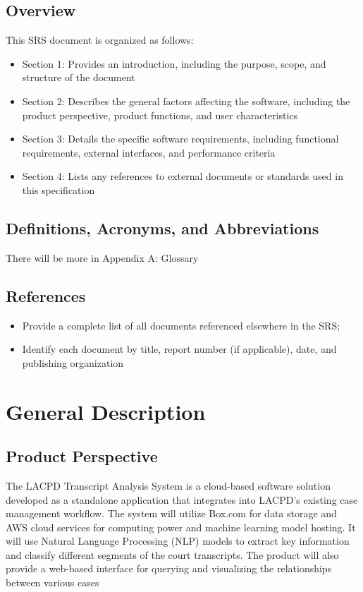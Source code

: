 \documentclass[12pt]{article}
\begin{document}
\subsection{Overview}
 This SRS document is organized as follows:
\begin{itemize}
  \item Section 1: Provides an introduction, including the purpose, scope, and structure of the
 document
  \item  Section 2: Describes the general factors affecting the software, including the product
 perspective, product functions, and user characteristics
  \item  Section 3: Details the specific software requirements, including functional requirements,
 external interfaces, and performance criteria
  \item Section 4: Lists any references to external documents or standards used in this specification
\end{itemize}

\subsection{Definitions, Acronyms, and Abbreviations}
 There will be more in Appendix A: Glossary

\subsection{References}
\begin{itemize}
  \item  Provide a complete list of all documents referenced elsewhere in the SRS;
  \item  Identify each document by title, report number (if applicable), date, and publishing
 organization
\end{itemize}

\section{General Description}
\subsection{Product Perspective}
 The LACPD Transcript Analysis System is a cloud-based software solution developed as a
 standalone application that integrates into LACPD’s existing case management workflow. The
 system will utilize Box.com for data storage and AWS cloud services for computing power and
 machine learning model hosting. It will use Natural Language Processing (NLP) models to
 extract key information and classify different segments of the court transcripts. The product will
 also provide a web-based interface for querying and visualizing the relationships between
 various cases
\end{document}
